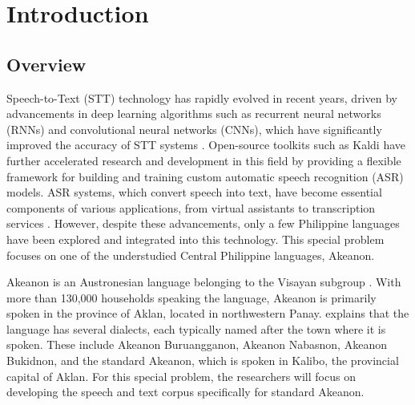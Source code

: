 \chapter{Introduction}
\label{sec:researchdesc}    %

\section{Overview}
\label{sec:overview}

Speech-to-Text (STT) technology has rapidly evolved in recent years, driven by advancements in deep learning algorithms such as recurrent neural networks (RNNs) and convolutional neural networks (CNNs), which have significantly improved the accuracy of STT systems \cite{Televic:2024}. Open-source toolkits such as Kaldi have further accelerated research and development in this field by providing a flexible framework for building and training custom automatic speech recognition (ASR) models. ASR systems, which convert speech into text, have become essential components of various applications, from virtual assistants to transcription services . However, despite these advancements, only a few Philippine languages have been explored and integrated into this technology. This special problem focuses on one of the understudied \cite{Wellstood:2022} Central Philippine languages, Akeanon. 

Akeanon is an Austronesian language belonging to the Visayan subgroup \cite{Biray:2023}. With more than 130,000 households \cite{PSA:2023} speaking the language, Akeanon is primarily spoken in the province of Aklan, located in northwestern Panay.  explains that the language has several dialects, each typically named after the town where it is spoken. These include Akeanon Buruangganon, Akeanon Nabasnon, Akeanon Bukidnon, and the standard Akeanon, which is spoken in Kalibo, the provincial capital of Aklan. For this special problem, the researchers will focus on developing the speech and text corpus specifically for standard Akeanon.

